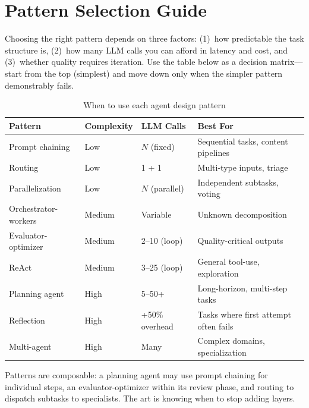 \section{Pattern Selection Guide}
\label{pattern-selection-guide}

Choosing the right pattern depends on three factors: (1)~how predictable the task structure is, (2)~how many LLM calls you can afford in latency and cost, and (3)~whether quality requires iteration. Use the table below as a decision matrix---start from the top (simplest) and move down only when the simpler pattern demonstrably fails.

\begin{table}[ht!]
\centering
\caption{When to use each agent design pattern}
\begin{tabular}{@{}lp{3.5cm}p{3.5cm}p{6cm}@{}}
\toprule
\textbf{Pattern} & \textbf{Complexity} & \textbf{LLM Calls} & \textbf{Best For} \\
\midrule
Prompt chaining & Low & $N$ (fixed) & Sequential tasks, content pipelines \\
Routing & Low & 1 + 1 & Multi-type inputs, triage \\
Parallelization & Low & $N$ (parallel) & Independent subtasks, voting \\
Orchestrator-workers & Medium & Variable & Unknown decomposition \\
Evaluator-optimizer & Medium & 2--10 (loop) & Quality-critical outputs \\
ReAct & Medium & 3--25 (loop) & General tool-use, exploration \\
Planning agent & High & 5--50+ & Long-horizon, multi-step tasks \\
Reflection & High & +50\% overhead & Tasks where first attempt often fails \\
Multi-agent & High & Many & Complex domains, specialization \\
\bottomrule
\end{tabular}
\end{table}

Patterns are composable: a planning agent may use prompt chaining for individual steps, an evaluator-optimizer within its review phase, and routing to dispatch subtasks to specialists. The art is knowing when to stop adding layers.

